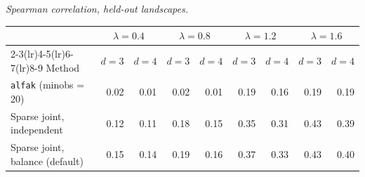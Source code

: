 \par\medskip\noindent\begin{minipage}{\linewidth}
\textit{Spearman correlation, held-out landscapes.}
\begin{center}
\footnotesize
\setlength{\tabcolsep}{3.5pt}
\begin{tabular}{l*{8}{r}}
\toprule
 & \multicolumn{2}{c}{$\lambda=0.4$} & \multicolumn{2}{c}{$\lambda=0.8$} & \multicolumn{2}{c}{$\lambda=1.2$} & \multicolumn{2}{c}{$\lambda=1.6$} \\
\cmidrule(lr){2-3}\cmidrule(lr){4-5}\cmidrule(lr){6-7}\cmidrule(lr){8-9}
Method & $d=3$ & $d=4$ & $d=3$ & $d=4$ & $d=3$ & $d=4$ & $d=3$ & $d=4$ \\
\midrule
\texttt{alfak} (minobs = 20) & 0.02 & 0.01 & 0.02 & 0.01 & 0.19 & 0.16 & 0.19 & 0.19 \\
Sparse joint, independent & 0.12 & 0.11 & 0.18 & 0.15 & 0.35 & 0.31 & 0.43 & 0.39 \\
Sparse joint, balance (default) & 0.15 & 0.14 & 0.19 & 0.16 & 0.37 & 0.33 & 0.43 & 0.40 \\
\bottomrule
\end{tabular}
\end{center}
\end{minipage}
